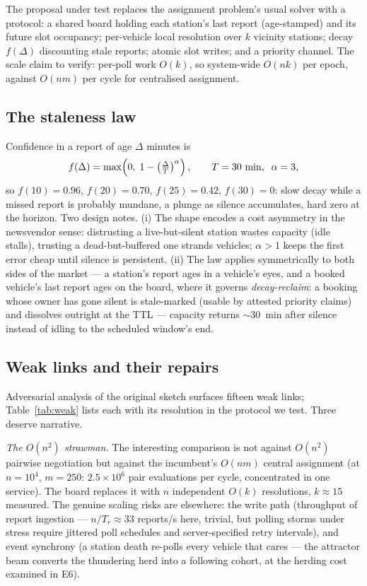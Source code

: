 \documentclass[twoside,twocolumn,usenatbib]{mnras}
\begin{document}
The proposal under test replaces the assignment problem's usual
solver with a protocol: a shared board holding each station's last
report (age-stamped) and its future slot occupancy; per-vehicle
local resolution over $k$ vicinity stations; decay $f(\Delta)$
discounting stale reports; atomic slot writes; and a priority
channel.  The scale claim to verify: per-poll work $O(k)$, so
system-wide $O(nk)$ per epoch, against $O(nm)$ per cycle for
centralised assignment.

\subsection{The staleness law}

\label{sec:decay}

Confidence in a report of age $\Delta$ minutes is
\begin{equation}
\label{eq:decay}
f(\Delta) = \max\!\left(0,\; 1 - \left(\tfrac{\Delta}{T}\right)^{\alpha}\right),
\qquad T=30~{\rm min},\;\; \alpha=3,
\end{equation}
so $f(10)=0.96$, $f(20)=0.70$, $f(25)=0.42$, $f(30)=0$: slow decay
while a missed report is probably mundane, a plunge as silence
accumulates, hard zero at the horizon.  Two design notes.  (i) The
shape encodes a cost asymmetry in the newsvendor sense: distrusting a
live-but-silent station wastes capacity (idle stalls), trusting a
dead-but-buffered one strands vehicles; $\alpha>1$ keeps the first
error cheap until silence is persistent.  (ii) The law applies
symmetrically to both sides of the market --- a station's report ages
in a vehicle's eyes, and a booked vehicle's last report ages on the
board, where it governs \emph{decay-reclaim}: a booking whose owner
has gone silent is stale-marked (usable by attested priority claims)
and dissolves outright at the TTL --- capacity returns $\sim$30~min
after silence instead of idling to the scheduled window's end.

\subsection{Weak links and their repairs}

\label{sec:weaklinks}

Adversarial analysis of the original sketch surfaces fifteen weak
links; Table~\ref{tab:weak} lists each with its resolution in the
protocol we test.  Three deserve narrative.

\emph{The $O(n^2)$ strawman.}  The interesting comparison is not
against $O(n^2)$ pairwise negotiation but against the incumbent's
$O(nm)$ central assignment (at $n=10^4$, $m=250$: $2.5\times10^6$
pair evaluations per cycle, concentrated in one service).  The board
replaces it with $n$ independent $O(k)$ resolutions, $k\approx15$
measured.  The genuine scaling risks are elsewhere: the write path
(throughput of report ingestion --- $n/T_r\approx33$ reports/s here,
trivial, but polling storms under stress require jittered poll
schedules and server-specified retry intervals), and event
synchrony (a station death re-polls every vehicle that cares --- the
attractor beam converts the thundering herd into a following cohort,
at the herding cost examined in E6).
\end{document}
